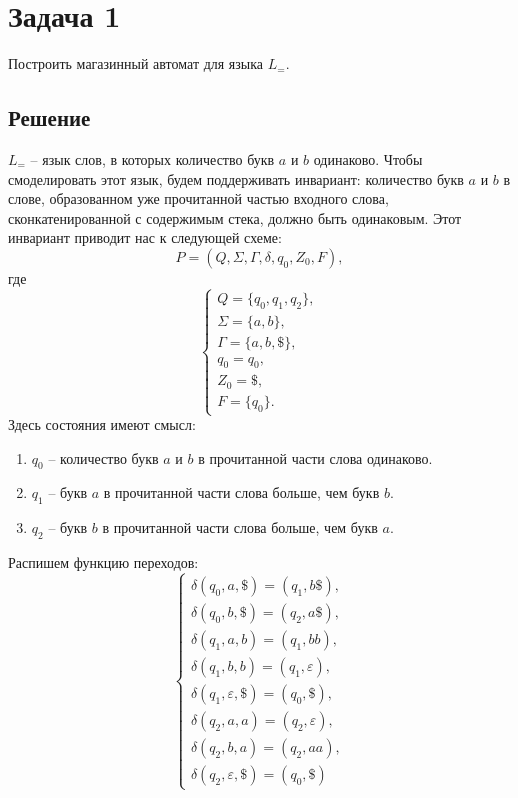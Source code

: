 \documentclass[11pt]{article}
\author{Sergey Makarov}
\date{\today}
\title{}
\begin{document}
\section{Задача 1}
\label{sec:orgb8491eb}
Построить магазинный автомат для языка \(L_=\).
\subsection{Решение}
\label{sec:orga307f05}
\(L_=\) -- язык слов, в которых количество букв \(a\) и \(b\) одинаково. Чтобы смоделировать этот
язык, будем поддерживать инвариант: количество букв \(a\) и \(b\) в слове, образованном уже
прочитанной частью входного слова, сконкатенированной с содержимым стека, должно быть
одинаковым. Этот инвариант приводит нас к следующей схеме:
\begin{equation}
P = (Q, \Sigma, \Gamma, \delta, q_0, Z_0, F),
\end{equation}
где
\begin{equation}
\begin{cases}
Q = \{q_0, q_1, q_2\}, \\
\Sigma = \{a, b\}, \\
\Gamma = \{a, b, \$\}, \\
q_0 = q_0, \\
Z_0 = \$, \\
F = \{q_0\}.
\end{cases}
\end{equation}
Здесь состояния имеют смысл:
\begin{enumerate}
\item $q_0$ -- количество букв $a$ и $b$ в прочитанной части слова одинаково.
\item $q_1$ -- букв $a$ в прочитанной части слова больше, чем букв $b$.
\item $q_2$ -- букв $b$ в прочитанной части слова больше, чем букв $a$.
\end{enumerate}
Распишем функцию переходов:
\begin{equation}
\begin{cases}
\delta(q_0, a, \$) = (q_1, b\$), \\
\delta(q_0, b, \$) = (q_2, a\$), \\
\delta(q_1, a, b) = (q_1, bb), \\
\delta(q_1, b, b) = (q_1, \varepsilon), \\
\delta(q_1, \varepsilon, \$) = (q_0, \$), \\
\delta(q_2, a, a) = (q_2, \varepsilon), \\
\delta(q_2, b, a) = (q_2, aa), \\
\delta(q_2, \varepsilon, \$) = (q_0, \$)
\end{cases}
\end{equation}
\end{document}
